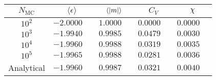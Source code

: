 \begin{tabular}{ccccc}
\toprule
$N_\mathrm{MC}$ & $\langle \epsilon \rangle$ & $\langle \abs{m} \rangle$ & $ C_V $ & $ \chi $ \\
\midrule
$10^{2}$   & $-2.0000\quad$ & $1.0000\quad$ & $0.0000\quad$ & $0.0000\quad$ \\
$10^{3}$   & $-1.9940\quad$ & $0.9985\quad$ & $0.0479\quad$ & $0.0030\quad$ \\
$10^{4}$   & $-1.9960\quad$ & $0.9988\quad$ & $0.0319\quad$ & $0.0035\quad$ \\
$10^{5}$   & $-1.9965\quad$ & $0.9988\quad$ & $0.0281\quad$ & $0.0036\quad$ \\
Analytical & $-1.9960\quad$ & $0.9987\quad$ & $0.0321\quad$ & $0.0040\quad$ \\
\bottomrule
\end{tabular}
